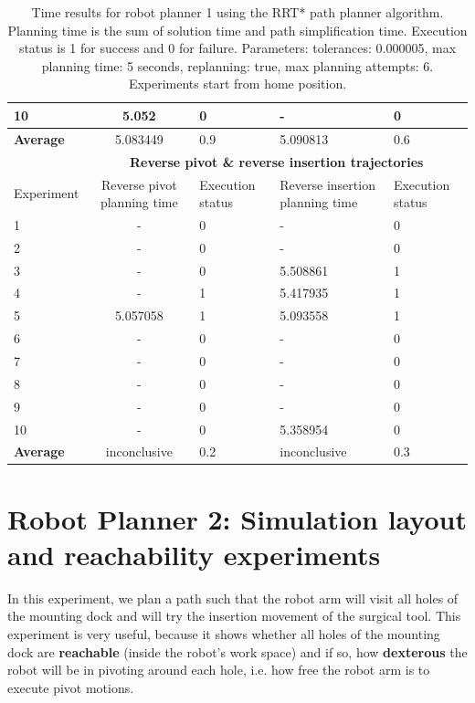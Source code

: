 \begin{table}[H]
\begin{tabular}{|p{2cm}|c|p{2cm}|p{2cm}|p{2cm}|}
10  & 5.052 & 0  & - &  0 \\
\hline
\textbf{Average} & 	5.083449	& 0.9	& 5.090813	& 0.6 \\
\hline
                          & \multicolumn{4}{c}{\textbf{Reverse pivot \& reverse insertion trajectories}}                     \vline \\
\hline
Experiment                & Reverse pivot planning time & Execution status & Reverse insertion planning time & Execution status  \\
\hline
1 & -	& 0	& -	& 0 \\
2 & -	& 0	& -	& 0 \\
3 & -	& 0	& 5.508861	& 1 \\
4 & -	& 1	& 5.417935	& 1 \\
5 & 5.057058	& 1	& 5.093558	& 1 \\
6 & -	& 0	& -	& 0 \\
7 & -	& 0	& -	& 0 \\
8 & -	& 0	& -	& 0 \\
9 & -	& 0	& -	& 0 \\
10  & -	& 0	& 5.358954	& 0 \\
\hline
\textbf{Average} & inconclusive	& 0.2	& inconclusive	& 0.3 \\
\hline
\end{tabular}
\caption{Time results for robot planner 1 using the RRT* path planner algorithm. Planning time is the sum of solution time and path simplification time. Execution status is 
1 for success and 0 for failure. Parameters: tolerances: 0.000005, max planning time: 5 seconds, replanning: true, max planning attempts: 6. Experiments start from home position.}
\label{robot-planner1-rrtstar-data}
\end{table}


\section{Robot Planner 2: Simulation layout and reachability experiments}

In this experiment, we plan a path such that the robot arm will visit all holes of the mounting dock and will try the insertion movement of the surgical tool.
This experiment is very useful, because it shows whether all holes of the mounting dock are \textbf{reachable} (inside the robot's work space) and if so, how 
\textbf{dexterous} the robot will be in pivoting around each hole, i.e. how free the robot arm is to execute pivot motions.

